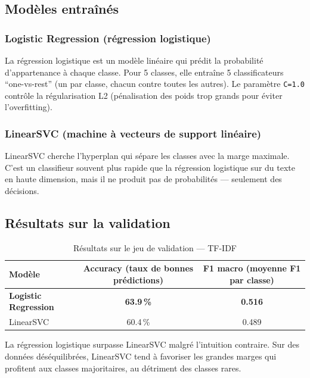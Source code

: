 \documentclass[12pt, a4paper]{article}
\begin{document}
\subsection{Modèles entraînés}

\subsubsection{Logistic Regression (régression logistique)}

La régression logistique est un modèle linéaire qui prédit la probabilité d'appartenance
à chaque classe. Pour 5 classes, elle entraîne 5 classificateurs ``one-vs-rest''
(un par classe, chacun contre toutes les autres). Le paramètre \texttt{C=1.0}
contrôle la régularisation L2 (pénalisation des poids trop grands pour éviter l'overfitting).

\subsubsection{LinearSVC (machine à vecteurs de support linéaire)}

LinearSVC cherche l'hyperplan qui sépare les classes avec la marge maximale.
C'est un classifieur souvent plus rapide que la régression logistique sur du texte
en haute dimension, mais il ne produit pas de probabilités — seulement des décisions.

\subsection{Résultats sur la validation}

\begin{table}[H]
  \centering
  \begin{tabular}{lcc}
    \toprule
    \textbf{Modèle} & \textbf{Accuracy (taux de bonnes prédictions)} & \textbf{F1 macro (moyenne F1 par classe)} \\
    \midrule
    \textbf{Logistic Regression} & \textbf{63.9\,\%} & \textbf{0.516} \\
    LinearSVC                    & 60.4\,\%          & 0.489          \\
    \bottomrule
  \end{tabular}
  \caption{Résultats sur le jeu de validation — TF-IDF}
\end{table}

La régression logistique surpasse LinearSVC malgré l'intuition contraire.
Sur des données déséquilibrées, LinearSVC tend à favoriser les grandes marges
qui profitent aux classes majoritaires, au détriment des classes rares.
\end{document}
